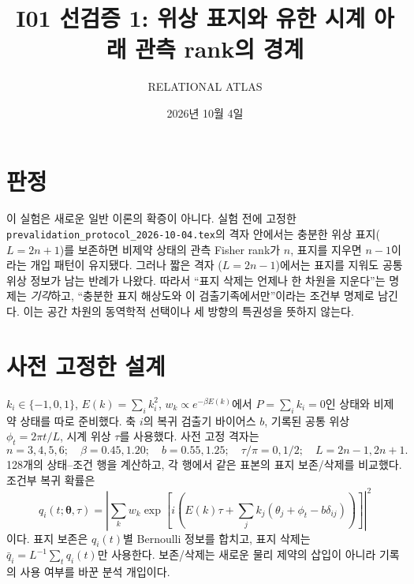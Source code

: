 \documentclass[11pt,a4paper]{article}
\title{I01 선검증 1: 위상 표지와 유한 시계 아래 관측 rank의 경계}
\author{RELATIONAL ATLAS}
\date{2026년 10월 4일}
\begin{document}
\maketitle

\section{판정}
이 실험은 새로운 일반 이론의 확증이 아니다. 실험 전에 고정한
\texttt{prevalidation\_protocol\_2026-10-04.tex}의 격자 안에서는
충분한 위상 표지($L=2n+1$)를 보존하면 비제약 상태의 관측 Fisher rank가 $n$,
표지를 지우면 $n-1$이라는 개입 패턴이 유지됐다. 그러나 짧은 격자
($L=2n-1$)에서는 표지를 지워도 공통 위상 정보가 남는 반례가 나왔다.
따라서 ``표지 삭제는 언제나 한 차원을 지운다''는 명제는 \emph{기각}하고,
``충분한 표지 해상도와 이 검출기족에서만''이라는 조건부 명제로 남긴다.
이는 공간 차원의 동역학적 선택이나 세 방향의 특권성을 뜻하지 않는다.

\section{사전 고정한 설계}
$k_i\in\{-1,0,1\}$, $E(k)=\sum_i k_i^2$,
$w_k\propto e^{-\beta E(k)}$에서 $P=\sum_i k_i=0$인 상태와 비제약 상태를
따로 준비했다. 축 $i$의 복귀 검출기 바이어스 $b$, 기록된 공통 위상
$\phi_t=2\pi t/L$, 시계 위상 $\tau$를 사용했다. 사전 고정 격자는
\begin{equation}
n=3,4,5,6;\quad \beta=0.45,1.20;\quad b=0.55,1.25;\quad
\tau/\pi=0,1/2;\quad L=2n-1,2n+1.
\end{equation}
128개의 상태--조건 행을 계산하고, 각 행에서 같은 표본의 표지 보존/삭제를
비교했다. 조건부 복귀 확률은
\begin{equation}
q_i(t;\boldsymbol\theta,\tau)
=\left|\sum_k w_k\exp\!\left[i\left(E(k)\tau+
\sum_j k_j(\theta_j+\phi_t-b\delta_{ij})\right)\right]\right|^2
\end{equation}
이다. 표지 보존은 $q_i(t)$별 Bernoulli 정보를 합치고, 표지 삭제는
$\bar q_i=L^{-1}\sum_t q_i(t)$만 사용한다. 보존/삭제는 새로운 물리 제약의
삽입이 아니라 기록의 사용 여부를 바꾼 분석 개입이다.
\end{document}

